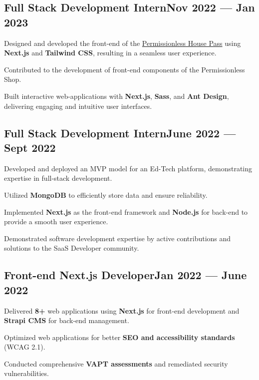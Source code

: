\subsection{{Full Stack Development Intern\hfill Nov 2022 --- Jan 2023}}
\begin{zitemize}
\item Designed and developed the front-end of the \href{https://permissionless.house}{Permissionless House Pass} using \textbf{Next.js} and \textbf{Tailwind CSS}, resulting in a seamless user experience.
\item Contributed to the development of front-end components of the Permissionless Shop.
\item Built interactive web-applications with \textbf{Next.js}, \textbf{Sass}, and \textbf{Ant Design}, delivering engaging and intuitive user interfaces.
\end{zitemize}

\subsection{{Full Stack Development Intern\hfill June 2022 --- Sept 2022}}
\begin{zitemize}
\item Developed and deployed an MVP model for an Ed-Tech platform, demonstrating expertise in full-stack development.
\item Utilized \textbf{MongoDB} to efficiently store data and ensure reliability.
\item Implemented \textbf{Next.js} as the front-end framework and \textbf{Node.js} for back-end to provide a smooth user experience.
\item Demonstrated software development expertise by active contributions and solutions to the SaaS Developer community.
\end{zitemize}

\subsection{{Front-end Next.js Developer\hfill Jan 2022 --- June 2022}}
\begin{zitemize}
\item Delivered \textbf{8+} web applications using \textbf{Next.js} for front-end development and \textbf{Strapi CMS} for back-end management.
\item Optimized web applications for better \textbf{SEO and accessibility standards} (WCAG 2.1).
\item Conducted comprehensive \textbf{VAPT assessments} and remediated security vulnerabilities.
\end{zitemize}

